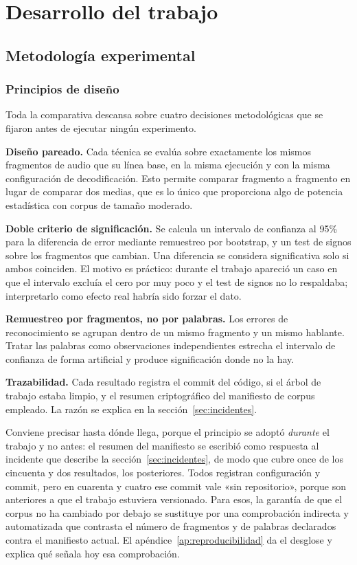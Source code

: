\chapter{Desarrollo del trabajo}
\label{cap:desarrollo}

\section{Metodología experimental}

\subsection{Principios de diseño}

Toda la comparativa descansa sobre cuatro decisiones metodológicas que se fijaron antes de
ejecutar ningún experimento.

\textbf{Diseño pareado.} Cada técnica se evalúa sobre exactamente los mismos fragmentos de
audio que su línea base, en la misma ejecución y con la misma configuración de
decodificación. Esto permite comparar fragmento a fragmento en lugar de comparar dos
medias, que es lo único que proporciona algo de potencia estadística con corpus de tamaño
moderado.

\textbf{Doble criterio de significación.} Se calcula un intervalo de confianza al 95\%
para la diferencia de error mediante remuestreo por bootstrap, y un test de signos sobre
los fragmentos que cambian. Una diferencia se considera significativa solo si ambos
coinciden. El motivo es práctico: durante el trabajo apareció un caso en que el intervalo
excluía el cero por muy poco y el test de signos no lo respaldaba; interpretarlo como
efecto real habría sido forzar el dato.

\textbf{Remuestreo por fragmentos, no por palabras.} Los errores de reconocimiento se
agrupan dentro de un mismo fragmento y un mismo hablante. Tratar las palabras como
observaciones independientes estrecha el intervalo de confianza de forma artificial y
produce significación donde no la hay.

\textbf{Trazabilidad.} Cada resultado registra el commit del código, si el árbol de
trabajo estaba limpio, y el resumen criptográfico del manifiesto de corpus empleado. La
razón se explica en la sección~\ref{sec:incidentes}.

Conviene precisar hasta dónde llega, porque el principio se adoptó \emph{durante} el
trabajo y no antes: el resumen del manifiesto se escribió como respuesta al incidente que
describe la sección~\ref{sec:incidentes}, de modo que cubre once de los cincuenta y dos
resultados, los posteriores. Todos registran configuración y commit, pero en cuarenta y
cuatro ese commit vale «sin repositorio», porque son anteriores a que el trabajo estuviera
versionado. Para esos, la garantía de que el corpus no ha cambiado por debajo se sustituye
por una comprobación indirecta y automatizada que contrasta el número de fragmentos y de
palabras declarados contra el manifiesto actual. El
apéndice~\ref{ap:reproducibilidad} da el desglose y explica qué señala hoy esa
comprobación.

